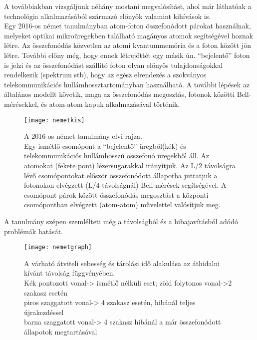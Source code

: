 A továbbiakban vizsgáljunk néhány mostani megvalósítást, ahol már láthatóak a technológia alkalmazásából származó előnyök valamint kihívások is.\\
Egy 2016-os német tanulmányban\cite{uphoff2016integrated} atom-foton összefonódott párokat használnak, melyeket optikai mikroüregekben található magányos atomok segítségével hoznak létre. Az összefonódás közvetlen az atomi kvantummemória és a foton között jön létre. További előny még, hogy ennek létrejöttét egy másik ún. “bejelentő” foton is jelzi és az összefonódást szállító foton olyan előnyös tulajdonságokkal rendelkezik (spektrum stb), hogy az egész elrendezés a szokványos telekommunikációs hullámhossztartományban használható. A további lépések az általános modellt követik, maga az összefonódás megosztás, fotonok közötti Bell-mérésekkel, és atom-atom kapuk alkalmazásával történik.
\begin{figure}[H]
\centering
\texttt{[image: nemetkis]}
\caption[Atom-foton ismétlő elvi rajza]{A 2016-os német tanulmány elvi rajza.\\
Egy ismétlő csomópont a “bejelentő” üregből(kék) és telekommunikációs hullámhosszú összefonó üregekből áll. Az atomokat (fekete pont) lézersugarakkal irányítjuk. Az L/2 távolságra lévő csomópontokat először összefonódott állapotba juttatjuk a fotonokon elvégzett (L/4 távolságnál) Bell-mérések segítségével. A csomópont párok között összefonódás megosztást a központi csomópontban elvégzett (atom-atom) művelettel valósítjuk meg.   
}
\end{figure}
A tanulmány szépen szemlélteti még a távolságból és a hibajavításból adódó problémák hatását.
\begin{figure}[H]
\centering
\texttt{[image: nemetgraph]}
\caption[Ismétlő teljesítmény]{A várható átviteli sebesség és tárolási idő alakulása az áthidalni kívánt távolság függvényében.\\
Kék pontozott vonal-> ismétlő nélküli eset; zöld folytonos vonal->2 szakasz esetén\\
piros szaggatott vonal-> 4 szakasz esetén, hibánál teljes újrakezdéssel\\
barna szaggatott vonal-> 4 szakasz hibánál a már összefonódott állapotok megtartásával\\
}
\end{figure}

